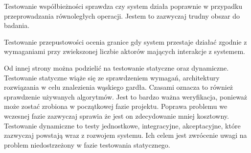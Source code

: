 Testowanie współbieżności sprawdza czy system działa poprawnie w przypadku przeprowadzania równoległych operacji.
Jestem to zazwyczaj trudny obszar do badania.

Testowanie przepustowości ocenia granice gdy system przestaje działać zgodnie z wymaganiami przy zwiekszonej liczbie aktorów mających interakcje z systemem.

Od innej strony można podzielić na testowanie statyczne oraz dynamiczne.
Testowanie statyczne wiąże się ze sprawdzeniem wymagań, architektury rozwiązania w celu znalezienia wąskiego gardła.
Czasami oznacza to również sprawdzenie używanych algorytmów.
Jest to bardzo ważna weryfikacja, ponieważ może zostać zrobiona w początkowej fazie projektu.
Poprawa problemu we wczesnej fazie zazwyczaj sprawia że jest on zdecydowanie mniej kosztowny.
Testowanie dynamiczne to testy jednostkowe, integracyjne, akceptacyjne, które zazwyczaj powstają wraz z rozwojem systemu.
Ich celem jest zwrócenie uwagi na problem niedostrzeżony w fazie testowania statycznego.
